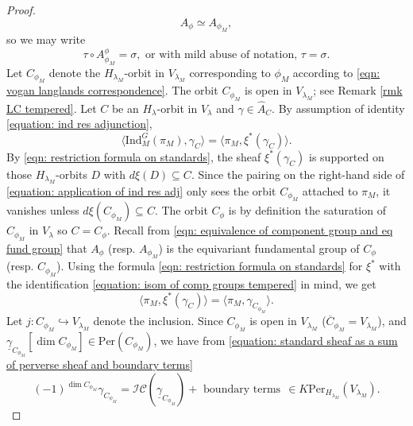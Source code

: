 \documentclass[11pt,letterpaper]{amsart}
\newcommand{\ol}{\overline}
\newcommand{\irrepdual}[1]{\widehat{#1}}
\newcommand{\Ind}{\mathrm{Ind}}
\newcommand{\Per}{\mathrm{Per}}
\newcommand{\locsys}[2]{\underline{#1}_{#2}}
\newcommand{\stsh}[2]{{#1}_{#2}}
\renewcommand{\1}{\mathbbm{1}}
\numberwithin{equation}{section}
\begin{document}
{\begin{proof}
\begin{equation}\label{equation: isom of comp groups tempered}
    A_\phi \simeq A_{\phi_M}, 
\end{equation}
so we may write \begin{equation}\label{equation: sigma is tau}
  \tau \circ   A_{\phi_M}^{\phi}=\sigma, \text{ or with mild abuse of notation, } \tau=\sigma.
\end{equation}
Let $C_{\phi_M}$ denote the $H_{\lambda_M}$-orbit in $V_{\lambda_M}$ corresponding to $\phi_M$ according to \eqref{eqn: vogan langlands correspondence}. The orbit $C_{\phi_M}$ is open in $V_{\lambda_M}$; see Remark \ref{rmk LC tempered}. Let $C$ be an $H_\lambda$-orbit in $V_\lambda$ and $\gamma \in \irrepdual{A}_C$. By assumption of identity \eqref{equation: ind res adjunction},
    \begin{equation}\label{equation: application of ind res adj}
        \langle \Ind_M^G(\pi_M), \stsh{\gamma}{C}\rangle = \langle \pi_M, \xi^*(\stsh{\gamma}{C})\rangle. \end{equation}
By \eqref{eqn: restriction formula on standards}, the sheaf $\xi^*(\stsh{\gamma}{C})$ is supported on those $H_{\lambda_M}$-orbits $D$ with $d\xi(D)\subseteq C$. Since the pairing on the right-hand side of \eqref{equation: application of ind res adj} only sees the orbit $C_{\phi_M}$ attached to $\pi_M$, it vanishes unless $d\xi(C_{\phi_M})\subseteq C$. %
The orbit $C_\phi$ is by definition the saturation of $C_{\phi_M}$ in $V_\lambda$ so $C=C_\phi$.
Recall from \eqref{eqn: equivalence of component group and eq fund group} that $A_{\phi}$ (resp. $A_{\phi_M}$) is the equivariant fundamental group of $C_\phi$ (resp. $C_{\phi_M}$). Using the formula \eqref{eqn: restriction formula on standards} for $\xi^*$ with the identification \eqref{equation: isom of comp groups tempered} in mind, we get
\[\langle \pi_M, \xi^*(\stsh{\gamma}{C})\rangle= \langle \pi_M,\stsh{\gamma}{C_{\phi_M}} \rangle.\]
Let $j:C_{\phi_M}\hookrightarrow V_{\lambda_M}$ denote the inclusion. Since $C_{\phi_M}$ is open in $V_{\lambda_M}$ ($\ol{C}_{\phi_M}=V_{\lambda_M}$), and $\locsys{\gamma}{C_{\phi_M}}[\dim C_{\phi_M}]\in \Per(C_{\phi_M})$, we have from \eqref{equation: standard sheaf as a sum of perverse sheaf and boundary terms} 
\[(-1)^{\dim C_{\phi_M}}\stsh{\gamma}{C_{\phi_M}}=\mathcal{IC}(\locsys{\gamma}{C_{\phi_M}})+ \text{ boundary terms} ~~\in K\Per_{H_{\lambda_M}}(V_{\lambda_M}).\]


\end{proof}}
\end{document}

